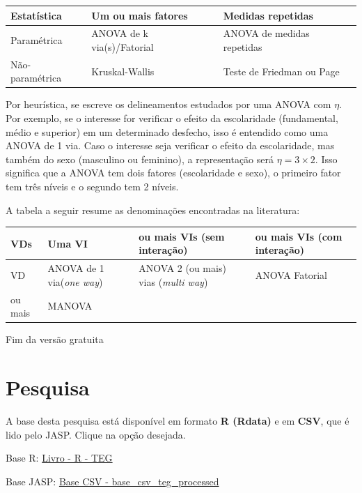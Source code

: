 \documentclass[
]{book}
\newenvironment{base}{
  \definecolor{shadecolor}{rgb}{0.764,0.992,0.686}  %
  \color{black}
  \begin{shaded}}
 {\end{shaded}}
\begin{document}
\begin{longtable}[]{@{}lll@{}}
\toprule
Estatística & Um ou mais fatores & Medidas repetidas \\
\midrule
\endhead
Paramétrica & ANOVA de k via(s)/Fatorial & ANOVA de medidas repetidas \\
Não-paramétrica & Kruskal-Wallis & Teste de Friedman ou Page \\
\bottomrule
\end{longtable}

Por heurística, se escreve os delineamentos estudados por uma ANOVA com \(\eta\). Por exemplo, se o interesse for verificar o efeito da escolaridade (fundamental, médio e superior) em um determinado desfecho, isso é entendido como uma ANOVA de 1 via. Caso o interesse seja verificar o efeito da escolaridade, mas também do sexo (masculino ou feminino), a representação será \(\eta = 3 \times 2\). Isso significa que a ANOVA tem dois fatores (escolaridade e sexo), o primeiro fator tem três níveis e o segundo tem 2 níveis.

A tabela a seguir resume as denominações encontradas na literatura:

\begin{longtable}[]{@{}
  >{\raggedright\arraybackslash}p{}
  >{\raggedright\arraybackslash}p{}
  >{\raggedright\arraybackslash}p{}
  >{\raggedright\arraybackslash}p{}@{}}
\toprule
VDs & Uma VI & 2 ou mais VIs (sem interação) & 2 ou mais VIs (com interação) \\
\midrule
\endhead
1 VD & ANOVA de 1 via(\emph{one way}) & ANOVA 2 (ou mais) vias (\emph{multi way}) & ANOVA Fatorial \\
2 ou mais & MANOVA & & \\
\bottomrule
\end{longtable}

Fim da versão gratuita

\hypertarget{pesquisa-4}{%
\section{Pesquisa}\label{pesquisa-4}}

\begin{base}
A base desta pesquisa está disponível em formato \textbf{R (Rdata)} e em \textbf{CSV}, que é lido pelo JASP. Clique na opção desejada.

Base R: \href{https://github.com/anovabr/mqt/raw/master/bases/Livro\%20-\%20R\%20-\%20TEG.RData}{Livro - R - TEG}

Base JASP: \href{https://github.com/anovabr/mqt/raw/master/bases/bases_csv_jasp.zip}{Base CSV - base\_csv\_teg\_processed}

\end{base}
\end{document}
